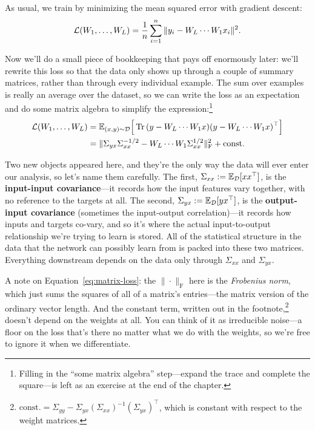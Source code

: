 As usual, we train by minimizing the mean squared error with gradient descent:
\begin{align*}
    \mathcal{L}(W_1, \dots, W_L)
    = \frac{1}{n} \sum_{i=1}^{n} \|y_i - W_L \cdots W_1 x_i\|^2.
\end{align*}

Now we'll do a small piece of bookkeeping that pays off enormously later: we'll rewrite this loss so that the data only shows up through a couple of summary matrices, rather than through every individual example. The sum over examples is
really an average over the dataset, so we can write the loss as an expectation
and do some matrix algebra to simplify the expression:\footnote{Filling in the ``some matrix algebra''
step---expand the trace and complete the square---is left as an exercise at the
end of the chapter.}
\begin{align}
    \mathcal{L}(W_1, \dots, W_L)
    &= \mathbb{E}_{(x,y)\sim\mathcal{D}}
       \Big[\Tr\, (y - W_L \cdots W_1 x)(y - W_L \cdots W_1 x)^\top \Big] \notag \\
    &= \|\Sigma_{yx}\Sigma_{xx}^{-1/2} - W_L \cdots W_1 \Sigma_{xx}^{1/2}\|_\mathrm{F}^2
       + \mathrm{const.} \label{eq:matrix-loss}  
\end{align}

Two new objects appeared here, and they're the only way the data will ever enter
our analysis, so let's name them carefully. The first,
$\Sigma_{xx} := \mathbb{E}_{\mathcal{D}}[xx^\top]$, is the \textbf{input-input
covariance}---it records how the input features vary together, with no reference
to the targets at all. The second, $\Sigma_{yx} := \mathbb{E}_{\mathcal{D}}[yx^\top]$, is
the \textbf{output-input covariance} (sometimes the input-output correlation)---it
records how inputs and targets co-vary, and so it's where the actual input-to-output relationship we're trying to learn is stored. All of the statistical structure in the data that the network can possibly learn from is packed into these two matrices. Everything downstream depends on the data only through $\Sigma_{xx}$ and $\Sigma_{yx}$.

A note on Equation~\eqref{eq:matrix-loss}: the $\|\cdot\|_\mathrm{F}$ here is the \emph{Frobenius norm}, which just sums the
squares of all of a matrix's entries---the matrix version of the ordinary vector
length. And the constant term, written out in the footnote,\footnote{$\mathrm{const.}
= \Sigma_{yy} - \Sigma_{yx}(\Sigma_{xx})^{-1}(\Sigma_{yx})^\top$, which is constant
with respect to the weight matrices.} doesn't depend on the weights at all. You
can think of it as irreducible noise---a floor on the loss that's there no matter
what we do with the weights, so we're free to ignore it when we differentiate.

